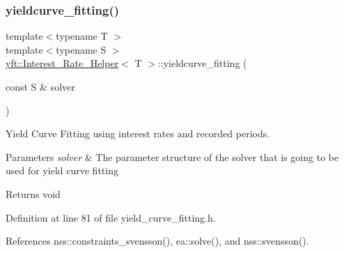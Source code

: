 \subsubsection{\texorpdfstring{yieldcurve\+\_\+fitting()}{yieldcurve\_fitting()}}
{\footnotesize\ttfamily template$<$typename T $>$ \\
template$<$typename S $>$ \\
\hyperlink{classyft_1_1_interest___rate___helper}{yft\+::\+Interest\+\_\+\+Rate\+\_\+\+Helper}$<$ T $>$\+::yieldcurve\+\_\+fitting (\begin{DoxyParamCaption}\item[{const S \&}]{solver }\end{DoxyParamCaption})\hspace{0.3cm}{\ttfamily [inline]}}



Yield Curve Fitting using interest rates and recorded periods. 


\begin{DoxyParams}{Parameters}
{\em solver} & The parameter structure of the solver that is going to be used for yield curve fitting \\
\hline
\end{DoxyParams}
\begin{DoxyReturn}{Returns}
void 
\end{DoxyReturn}


Definition at line 81 of file yield\+\_\+curve\+\_\+fitting.\+h.



References nss\+::constraints\+\_\+svensson(), ea\+::solve(), and nss\+::svensson().


